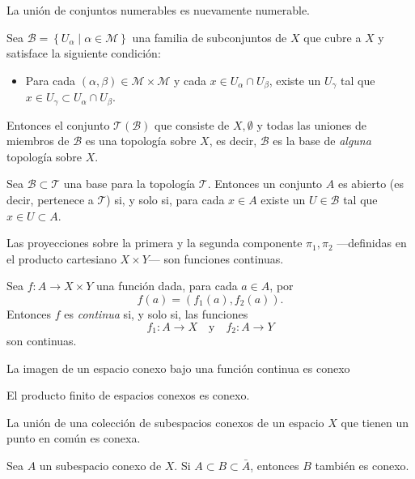 \documentclass[letterpaper,10pt,final]{article}
\begin{document}
\begin{teo}\label{teo:unionConNum}
	La unión de conjuntos numerables es nuevamente numerable.
\end{teo}

\begin{teo}\label{base1}
	Sea $\mathcal{B}=\left\{ U_\alpha \mid \alpha\in \mathscr{M} \right\}$ una familia de subconjuntos de $X$
	que cubre a $X$ y satisface la siguiente condición:
	\begin{itemize}
		\item 	Para cada $(\alpha,\beta)\in\mathscr{M}\times\mathscr{M}$ y cada $x\in U_\alpha\cap U_\beta$,
		existe un $U_\gamma$ tal que $x\in U_\gamma\subset U_\alpha\cap U_\beta$.
	\end{itemize}
	
	Entonces el conjunto $\mathcal{T}(\mathcal{B})$ que consiste de $X,\emptyset$ y todas las uniones de miembros
	de $\mathcal{B}$ es una topología sobre $X$, es decir, $\mathcal{B}$ es la base de \emph{alguna}
	topología sobre $X$.
\end{teo}

\begin{teo}\label{base2}
	Sea $\mathcal{B}\subset\mathcal{T}$ una base para la topología $\mathcal{T}$. Entonces un conjunto $A$
	es abierto (es decir, pertenece a $\mathcal{T}$) si, y solo si, para cada $x\in A$ existe un
	$U\in\mathcal{B}$ tal que $x\in U\subset A$.
\end{teo}

\begin{teo}\label{cont:funccoord}
	Las proyecciones sobre la primera y la segunda componente $\pi_1,\pi_2$ ---definidas en el producto cartesiano $X\times Y$--- son funciones continuas.	
\end{teo}

\begin{teo}\label{cont:proy}
	Sea $f:A\to X\times Y$ una función dada, para cada $a\in A$, por
	\[
	f(a)=(f_1(a),f_2(a)).
	\]
	Entonces $f$ es \emph{continua} si, y solo si, las funciones
	\[
	f_1:A\to X\quad\text{y}\quad f_2:A\to Y 
	\]
	son continuas. 
\end{teo}

\begin{teo}\label{conex:contfunct}
	La imagen de un espacio conexo bajo una función continua es conexo
\end{teo}

\begin{teo}\label{conex:prod}
	El producto finito de espacios conexos es conexo.
\end{teo}

\begin{teo}\label{conex:union}
	La unión de una colección de subespacios conexos de un espacio $X$ que tienen un
	punto en común es conexa.
\end{teo}

\begin{teo}\label{conex:cerrad}
	Sea $A$ un subespacio conexo de $X$. Si $A\subset B\subset\bar A$, entonces $B$
	también es conexo.
\end{teo}

\printbibliography[
heading=bibintoc,
title={Referencias bibliográficas}
]
\end{document}

